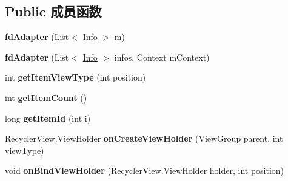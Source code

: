 \subsection*{Public 成员函数}
\begin{DoxyCompactItemize}
\item 
\mbox{\label{classcom_1_1example_1_1twitter_1_1fd_adapter_afa3bc2952f946d5f50caf6fac486a840}} 
{\bfseries fd\+Adapter} (List$<$ \mbox{\hyperlink{classcom_1_1example_1_1twitter_1_1_info}{Info}} $>$ m)
\item 
\mbox{\label{classcom_1_1example_1_1twitter_1_1fd_adapter_ac3197e8c8c3ecdfdc78cc0a409156e9d}} 
{\bfseries fd\+Adapter} (List$<$ \mbox{\hyperlink{classcom_1_1example_1_1twitter_1_1_info}{Info}} $>$ infos, Context m\+Context)
\item 
\mbox{\label{classcom_1_1example_1_1twitter_1_1fd_adapter_a4d4a9064dd8bf0c032647ad6ad0fa1b0}} 
int {\bfseries get\+Item\+View\+Type} (int position)
\item 
\mbox{\label{classcom_1_1example_1_1twitter_1_1fd_adapter_a283ab569921448a1bacc2daffe7852ef}} 
int {\bfseries get\+Item\+Count} ()
\item 
\mbox{\label{classcom_1_1example_1_1twitter_1_1fd_adapter_a3f166739a670e893b3e80144faad7bc1}} 
long {\bfseries get\+Item\+Id} (int i)
\item 
\mbox{\label{classcom_1_1example_1_1twitter_1_1fd_adapter_a90fc82f23450a8c98efe525d503d7970}} 
Recycler\+View.\+View\+Holder {\bfseries on\+Create\+View\+Holder} (View\+Group parent, int view\+Type)
\item 
\mbox{\label{classcom_1_1example_1_1twitter_1_1fd_adapter_a37e093433f61f4e2e9ae7989037fe833}} 
void {\bfseries on\+Bind\+View\+Holder} (Recycler\+View.\+View\+Holder holder, int position)
\end{DoxyCompactItemize}

